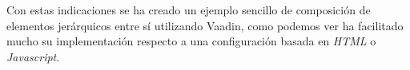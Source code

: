 
Con estas indicaciones se ha creado un ejemplo sencillo de composición de elementos jerárquicos entre sí utilizando Vaadin, como podemos ver ha facilitado mucho su implementación respecto a una configuración basada en \emph{HTML} o \emph{Javascript}.

